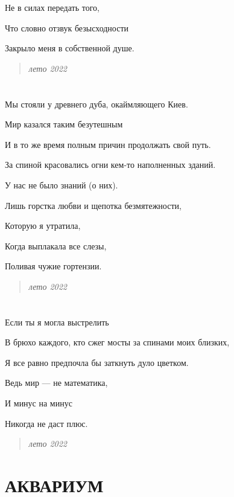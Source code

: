 \documentclass[
  a5paperpaper,
  DIV=11,
  numbers=noendperiod]{scrreprt}
\begin{document}
Не в силах передать того,

Что словно отзвук безысходности

Закрыло меня в собственной душе.

\begin{quote}
\emph{лето 2022}
\end{quote}

\section*{}\label{section-12}

\markright{}

Мы стояли у древнего дуба, окаймляющего Киев.

Мир казался таким безутешным

И в то же время полным причин продолжать свой путь.

За спиной красовались огни кем-то наполненных зданий.

У нас не было знаний (о них).

Лишь горстка любви и щепотка безмятежности,

Которую я утратила,

Когда выплакала все слезы,

Поливая чужие гортензии.

\begin{quote}
\emph{лето 2022}
\end{quote}

\section*{}\label{section-13}

\markright{}

Если ты я могла выстрелить

В брюхо каждого, кто сжег мосты за спинами моих близких,

Я все равно предпочла бы заткнуть дуло цветком.

Ведь мир --- не математика,

И минус на минус

Никогда не даст плюс.

\begin{quote}
\emph{лето 2022}
\end{quote}

\section*{АКВАРИУМ}\label{ux430ux43aux432ux430ux440ux438ux443ux43c}
\end{document}
